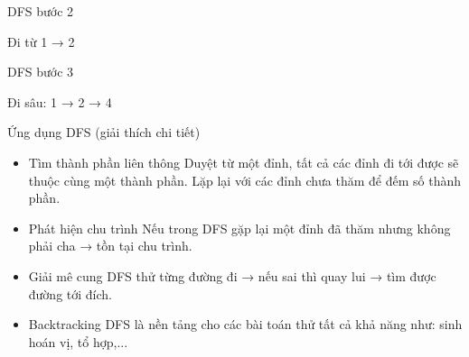 \documentclass{beamer}
\newcommand{\hlblue}[1]{\textcolor{myblue}{#1}}
\newcommand{\hlgreen}[1]{\textcolor{mygreen}{#1}}
\newcommand{\hlred}[1]{\textcolor{myred}{#1}}
\newcommand{\hlorange}[1]{\textcolor{myorange}{#1}}
\begin{document}
\begin{frame}{DFS bước 2}
\begin{center}
\end{center}

Đi từ 1 → 2
\end{frame}

\begin{frame}{DFS bước 3}
\begin{center}
\end{center}

Đi sâu: 1 → 2 → 4
\end{frame}

\begin{frame}{Ứng dụng DFS (giải thích chi tiết)}

\begin{itemize}

\item \hlblue{Tìm thành phần liên thông}  
Duyệt từ một đỉnh, tất cả các đỉnh đi tới được sẽ thuộc cùng một thành phần.  
Lặp lại với các đỉnh chưa thăm để đếm số thành phần.

\vspace{5pt}

\item \hlgreen{Phát hiện chu trình}  
Nếu trong DFS gặp lại một đỉnh đã thăm nhưng không phải cha → tồn tại chu trình.


\vspace{5pt}

\item \hlorange{Giải mê cung}  
DFS thử từng đường đi → nếu sai thì quay lui → tìm được đường tới đích.

\vspace{5pt}

\item \hlred{Backtracking}  
DFS là nền tảng cho các bài toán thử tất cả khả năng như: sinh hoán vị, tổ hợp,...

\end{itemize}

\end{frame}
\end{document}
